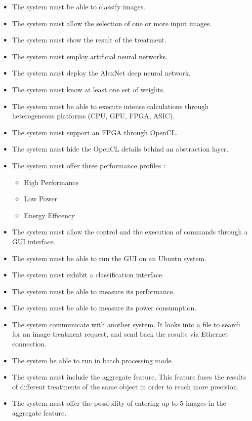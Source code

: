 \documentclass[parskip=full]{scrartcl}
\begin{document}
\begin{itemize}
	\item The system must be able to classify images.
	\item The system must allow the selection of one or more input images.
	\item The system must show the result of the treatment.
	\item The system must employ artificial neural networks.
	\item The system must deploy the AlexNet deep neural network.
	\item The system must know at least one set of weights.
	\item The system must be able to execute intense calculations through heterogeneous platforms (CPU, GPU, FPGA, ASIC).
	\item The system must support an FPGA through OpenCL.
	\item The system must hide the OpenCL details behind an abstraction layer.
	\item The system must offer three performance profiles : 
	\begin{itemize}
		\item High Performance
		\item Low Power
		\item Energy Efficency
	\end{itemize}
	\item The system must allow the control and the execution of commands through a GUI interface.
	\item The system must be able to run the GUI on an Ubuntu system.
	\item The system must exhibit a classification interface.
	\item The system must be able to measure its performance.
	\item The system must be able to measure its power consumption.
	\item The system communicate with another system. It looks into a file to search for an image treatment request, and send back the results via Ethernet connection.
	\item The system be able to run in batch processing mode.
	\item The system must include the aggregate feature. This feature fuses the results of different treatments of the same object in order to reach more precision.
	\item The system must offer the possibility of entering up to 5 images in the aggregate feature.
\end{itemize}
\end{document}
